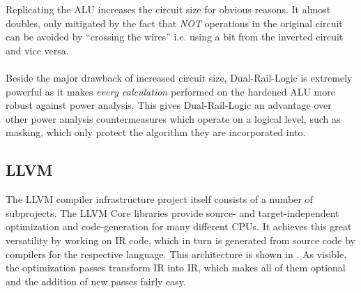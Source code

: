 \documentclass{article}
\newcommand{\dual}{Dual-Rail-Logic}
\newcommand{\llvm}{LLVM}
\newcommand{\lc}{\llvm{} Core}
\begin{document}
Replicating the ALU increases the circuit size for obvious reasons.
It almost doubles, only mitigated by the fact that \emph{NOT} operations in the original circuit can be avoided by ``crossing the wires'' i.e. using a bit from the inverted circuit and vice versa.
\\
\\
Beside the major drawback of increased circuit size, \dual{} is extremely powerful as it makes \emph{every calculation} performed on the hardened ALU more robust against power analysis.
This gives \dual{} an advantage over other power analysis countermeasures which operate on a logical level, such as masking\cite{messerges2000securing}, which only protect the algorithm they are incorporated into.

\subsection{\llvm{}}
The \llvm{} compiler infrastructure project\cite{lattner2004llvm} itself consists of a number of subprojects.
The \lc{} libraries provide source- and target-independent optimization and code-generation for many different CPUs.\cite{lattner2010llvm}
It achieves this great versatility by working on IR code, which in turn is generated from source code by compilers for the respective language.
This architecture is shown in .
As visible, the optimization passes transform IR into IR, which makes all of them optional and the addition of new passes fairly easy.
\end{document}
